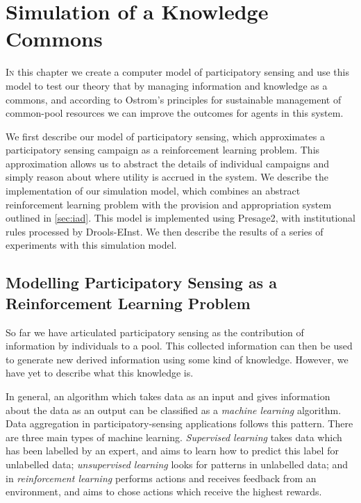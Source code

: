 \acresetall
\chapter{Simulation of a Knowledge Commons}\label{ch:results}

\lettrine[lines=3]{I}{n} this chapter we create a computer model of participatory sensing and use
this model to test our theory that by managing information and knowledge as a
commons, and according to Ostrom's principles for sustainable management of
common-pool resources we can improve the outcomes for agents in this system.

We first describe our model of participatory sensing, which approximates a
participatory sensing campaign as a reinforcement learning problem. This
approximation allows us to abstract the details of individual campaigns and
simply reason about where utility is accrued in the system.  We describe the
implementation of our simulation model, which combines an abstract
reinforcement learning problem with the provision and appropriation system
outlined in \autoref{sec:iad}. This model is implemented using Presage2, with
institutional rules processed by Drools-EInst. We then describe the results of
a series of experiments with this simulation model.

\section{Modelling Participatory Sensing as a Reinforcement Learning Problem}

So far we have articulated participatory sensing as the contribution of
information by individuals to a pool. This collected information can then be
used to generate new derived information using some kind of knowledge.
However, we have yet to describe what this knowledge is.

In general, an algorithm which takes data as an input and gives information
about the data as an output can be classified as a \emph{machine learning}
algorithm. Data aggregation in participatory-sensing applications follows this
pattern. There are three main types of machine learning. \emph{Supervised
learning} takes data which has been labelled by an expert, and aims to learn
how to predict this label for unlabelled data; \emph{unsupervised learning}
looks for patterns in unlabelled data; and in \emph{reinforcement learning}
performs actions and receives feedback from an environment, and aims to chose
actions which receive the highest rewards.

